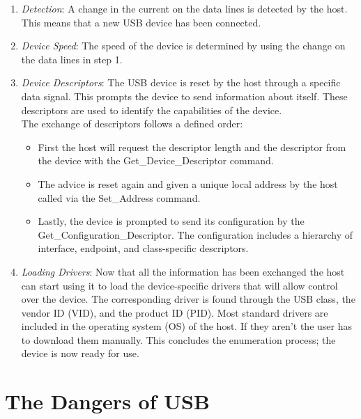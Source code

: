 \begin{enumerate}
    \item \emph{Detection}: A change in the current on the data lines is detected by the host. This means that a new USB device has been connected.
    \item \emph{Device Speed}: The speed of the device is determined by using the change on the data lines in step 1.
    \item \emph{Device Descriptors}: The USB device is reset by the host through a specific data signal. This prompts the device to send information about itself. These descriptors are used to identify the capabilities of the device.  \\
    The exchange of descriptors follows a defined order: 
    \begin{itemize}
        \item First the host will request the descriptor length and the descriptor from the device with the Get\_Device\_Descriptor command.
        \item The advice is reset again and given a unique local address by the host called via the Set\_Address command. 
        \item Lastly, the device is prompted to send its configuration by the Get\_Configuration\_Descriptor. The configuration includes a hierarchy of interface, endpoint, and class-specific descriptors.  
    \end{itemize}
    \item \emph{Loading Drivers}: Now that all the information has been exchanged the host can start using it to load the device-specific drivers that will allow control over the device. The corresponding driver is found through the USB class, the vendor ID (VID), and the product ID (PID). Most standard drivers are included in the operating system (OS) of the host. If they aren't the user has to download them manually. This concludes the enumeration process; the device is now ready for use.
\end{enumerate}




\section{The Dangers of USB} \label{TheDangersOfUSB}

